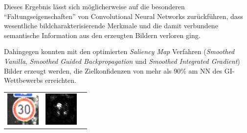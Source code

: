 Dieses Ergebnis lässt sich möglicherweise auf die besonderen "`Faltungseigenschaften"' von Convolutional Neural Networks zurückführen, dass wesentliche bildcharakterisierende Merkmale und die damit verbundene semantische Information aus den erzeugten Bildern verloren ging.

Dahingegen konnten mit den optimierten \textit{Saliency Map} Verfahren (\textit{Smoothed Vanilla}, \textit{Smoothed Guided Backpropagation} und \textit{Smoothed Integrated Gradient}) Bilder erzeugt werden, die Zielkonfidenzen von mehr als 90\% am \ac{NN} des \ac{GI}-Wettbewerbs erreichten.

\begin{table}
	\centering
	\begin{tabular}{p{4.5cm}p{4.5cm}p{4.5cm}}
		\includegraphics[width=\linewidth]{Images/AnPe/5_1_Links} & \includegraphics[width=\linewidth]{Images/AnPe/5_1_Mitte} &

\end{tabular}
\end{table}
